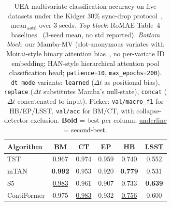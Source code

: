 
\begin{table}[t]
\caption{UEA multivariate classification accuracy on five datasets under
the Kidger 30\% sync-drop protocol~\citep{kidger2020ncde}, mean$_{\pm\text{std}}$
over 3 seeds. \emph{Top block}: RoMAE Table~4 baselines~\citep{zivanovic2025rotary}
(3-seed mean, no std reported). \emph{Bottom block}: our Mamba-MV (slot-anonymous
variates with Moirai-style binary attention bias~\citep{woo2024moirai}, no
per-variate ID embedding; HAN-style hierarchical attention pool classification
head; \texttt{patience=10}, \texttt{max\_epochs=200}). \texttt{dt\_mode} variants:
\texttt{learned} ($\Delta t$ as positional bias), \texttt{replace} ($\Delta t$
substitutes Mamba's null-state), \texttt{concat} ($\Delta t$ concatenated to input).
Picker: \texttt{val/macro\_f1} for HB/EP/LSST, \texttt{val/acc} for BM/CT, with
collapse-detector exclusion. \textbf{Bold} = best per column;
\underline{underline} = second-best.}
\label{tab:uea_results}
\centering
\setlength{\tabcolsep}{4pt}
\renewcommand{\arraystretch}{1.05}
\small
\begin{tabular}{lccccc}
\toprule
Algorithm                & BM                                       & CT                                       & EP                                       & HB                                       & LSST                                     \\
\midrule
TST                      & 0.967                                    & 0.974                                    & 0.959                                    & 0.740                                    & 0.552                                    \\
mTAN                     & \textbf{0.992}                           & 0.953                                    & 0.920                                    & \textbf{0.779}                           & 0.531                                    \\
S5                       & \underline{0.983}                        & 0.961                                    & 0.907                                    & 0.733                                    & \textbf{0.639}                           \\
ContiFormer              & 0.975                                    & \underline{0.983}                        & 0.932                                    & \underline{0.756}                        & 0.600                                    \\

\end{tabular}
\end{table}
